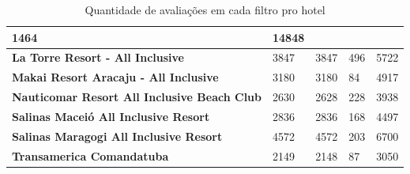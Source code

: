 \begin{table}[]
\begin{tabular}{|p{5cm}|l|l|l|l|}
		1464                                                &
		14848                                                 \\
		\hline
		\textbf{La Torre Resort - All Inclusive}            &
		3847                                                &
		3847                                                &
		496                                                 &
		5722                                                  \\
		\hline
		\textbf{Makai Resort Aracaju - All Inclusive}       &
		3180                                                &
		3180                                                &
		84                                                  &
		4917                                                  \\
		\hline
		\textbf{Nauticomar Resort All Inclusive Beach Club} &
		2630                                                &
		2628                                                &
		228                                                 &
		3938                                                  \\
		\hline
		\textbf{Salinas Maceió All Inclusive Resort}        &
		2836                                                &
		2836                                                &
		168                                                 &
		4497                                                  \\
		\hline
		\textbf{Salinas Maragogi All Inclusive Resort}      &
		4572                                                &
		4572                                                &
		203                                                 &
		6700                                                  \\
		\hline
		\textbf{Transamerica Comandatuba}                   &
		2149                                                &
		2148                                                &
		87                                                  &
		3050                                                  \\ \hline
	\end{tabular}
	\caption{Quantidade de avaliações em cada filtro pro hotel}
	\label{table:qtd_review_filtro}
\end{table}

